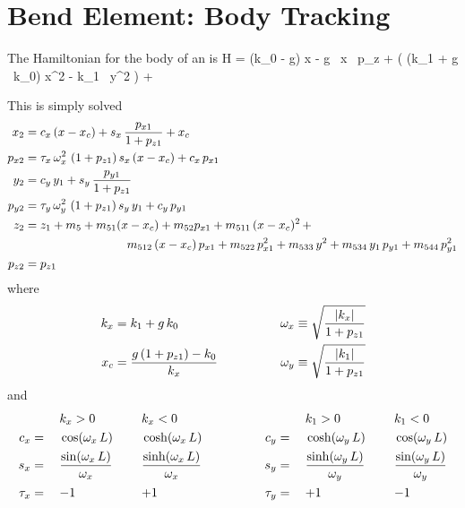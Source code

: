 \section{Bend Element: Body Tracking}
\label{s:bend.body.std}

The Hamiltonian for the body of an  is
\Begineq
  H = (k_0 - g) x - g \, x \, p_z + 
  \left( (k_1 + g \, k_0) x^2 - k_1 \, y^2 \right) +
\Endeq

This is simply solved
\begin{align}
  x_2    &= c_x \, (x - x_c) + s_x \, \frac{p_{x1}}{1 + p_{z1}} + x_c \CRNO
  p_{x2} &= \tau_x \, \om_x^2 \, \, (1 + p_{z1}) \, s_x \, (x -x_c) + c_x \, p_{x1} \CRNO
  y_2    &= c_y \, y_1 + s_y \, \frac{p_{y1}}{1 + p_{z1}} \CRNO
  p_{y2} &= \tau_y \, \om_y^2 \, \, (1 + p_{z1}) \, s_y \, y_1 + c_y \, p_{y1} \\
  z_2    &= z_1 + m_5 + m_{51} (x - x_c) + m_{52} p_{x1} + m_{511} \, (x-x_c)^2 \, + \CRNO
         &\hspace*{20ex} m_{512} \, (x-x_c) \, p_{x1} + m_{522} \, p_{x1}^2 + 
                         m_{533} \, y^2 + m_{534} \, y_1 \, p_{y1} + m_{544} \, p_{y1}^2 \CRNO
  p_{z2} &= p_{z1} \nonumber
\end{align}
where 
\begin{alignat}{2}
  k_x &= k_1 + g \, k_0 & \qquad \qquad
  \omega_x &\equiv \sqrt{\frac{|k_x|}{1 + p_{z1}}} \nonumber \\
  x_c &= \frac{g \, (1 + p_{z1}) - k_0}{k_x} & \qquad \qquad
  \omega_y &\equiv \sqrt{\frac{|k_1|}{1 + p_{z1}}} 
\end{alignat}
and
\begin{alignat}{6}
         &\hspace*{3ex}  && k_x > 0          &\hspace*{3ex}& k_x < 0 & \qquad \qquad
         &\hspace*{3ex}  && k_1 > 0          &\hspace*{3ex}& k_1 < 0 \nonumber \\
     c_x &=   && \cos  (\omega_x \, L)               && \cosh (\omega_x \, L) & \qquad \qquad
     c_y &=   && \cosh (\omega_y \, L)               && \cos  (\omega_y \, L) \nonumber \\
     s_x &=   && \frac{\sin  (\omega_x \, L)}{\omega_x} && \frac{\sinh (\omega_x \, L)}{\omega_x} & \qquad \qquad
     s_y &=   && \frac{\sinh (\omega_y \, L)}{\omega_y} && \frac{\sin  (\omega_y \, L)}{\omega_y} \\
  \tau_x &=   && {-}1             && {+}1             & \qquad \qquad
  \tau_y &=   && {+}1             && {-}1             \nonumber
\end{alignat}
